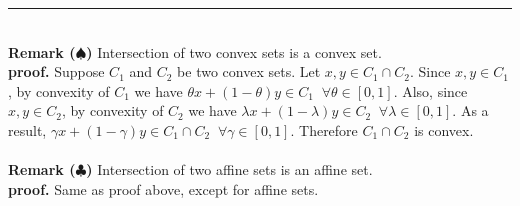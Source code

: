 \documentclass[12pt, letterpaper, twoside]{article}
\begin{document}
\hrule
\textbf{\\Remark ($\spadesuit$)} 
{\color{violet}Intersection of two convex sets is a convex set.}\\
\textbf{proof.} Suppose $C_1$ and $C_2$ be two convex sets. Let $x,y\in C_1\cap C_2$. Since $x,y\in C_1$, by convexity of $C_1$ we have $\theta x + (1-\theta)y\in C_1\;\;\forall \theta\in[0,1]$. Also, since $x,y\in C_2$, by convexity of $C_2$ we have $\lambda x + (1-\lambda)y\in C_2\;\;\forall \lambda\in[0,1]$. As a result, $\gamma x + (1-\gamma)y\in C_1\cap C_2\;\;\forall \gamma\in[0,1]$. Therefore $C_1\cap C_2$ is convex.\\\\
\textbf{Remark ($\clubsuit$)} 
{\color{violet}Intersection of two affine sets is an affine set.}\\
\textbf{proof.} Same as proof above, except for affine sets.
\end{document}
